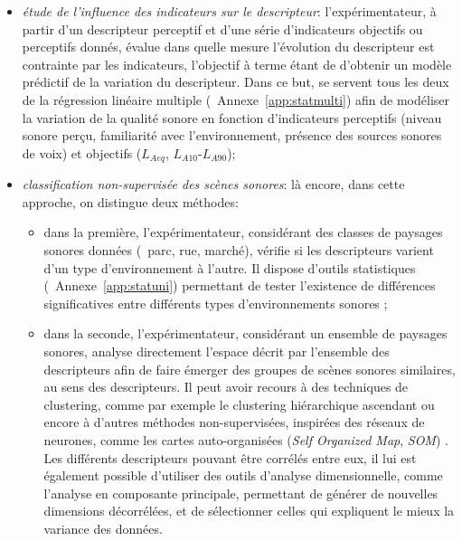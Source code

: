 \begin{itemize}
\item \emph{étude de l'influence des indicateurs sur le descripteur}: l'expérimentateur, à partir d'un descripteur perceptif et d'une série d'indicateurs objectifs ou perceptifs donnés, évalue dans quelle mesure l'évolution du descripteur est contrainte par les indicateurs, l'objectif à terme étant de d'obtenir un modèle prédictif de la variation du descripteur. Dans ce but, \citep{lavandier2006contribution,ricciardi2015sound} se servent tous les deux de la régression linéaire multiple (\cf~Annexe~\ref{app:statmulti}) afin de modéliser la variation de la qualité sonore en fonction d'indicateurs perceptifs (niveau sonore perçu, familiarité avec l'environnement, présence des sources sonores de voix) et objectifs ($L_{Aeq}$, $L_{A10}$-$L_{A90}$);

\item \emph{classification non-supervisée des scènes sonores}: là encore, dans cette approche, on distingue deux méthodes:

\begin{itemize}
\item dans la première, l'expérimentateur, considérant des classes de paysages sonores données (\eg~parc, rue, marché), vérifie si les descripteurs varient d'un type d'environnement à l'autre. Il dispose d'outils statistiques (\cf~Annexe~\ref{app:statuni}) permettant de tester l'existence de différences significatives entre différents types d'environnements sonores \citep{hong2013designing};
\item dans la seconde, l'expérimentateur, considérant un ensemble de paysages sonores, analyse directement l'espace décrit par l'ensemble des descripteurs afin de faire émerger des groupes de scènes sonores similaires, au sens des descripteurs. Il peut avoir recours à des techniques de clustering, comme par exemple le clustering hiérarchique ascendant \citep{torija2013application} ou encore à d'autres méthodes non-supervisées, inspirées des réseaux de neurones, comme les cartes auto-organisées (\emph{Self Organized Map}, \emph{SOM}) \citep{ricciardi2015sound}. Les différents descripteurs pouvant être corrélés entre eux, il lui est également possible d'utiliser des outils d'analyse dimensionnelle, comme l'analyse en composante principale, permettant de générer de nouvelles dimensions décorrélées, et de sélectionner celles qui expliquent le mieux la variance des données.
\end{itemize}

\end{itemize}

